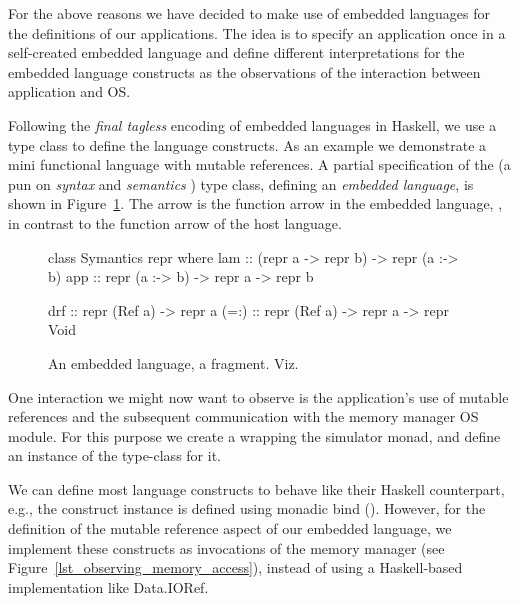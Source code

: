 For the above reasons we have decided to make use of embedded languages for the definitions of our applications.
The idea is to specify an application once in a self-created embedded language and define different interpretations for the embedded language constructs as the observations of the interaction between application and OS\nolinebreak[3]  \cite{Hofer:2008:PED:1449913.1449935}.

Following the \emph{final tagless} \cite{final_tagless_embedding} encoding of embedded languages in Haskell, we use a type class to define the language constructs.
As an example we demonstrate a mini functional language with mutable references.
A partial specification of the  (a pun on \emph{syntax} and \emph{semantics} \cite{final_tagless_embedding}) type class, defining an \emph{embedded language}, is shown in Figure~\ref{fig:embedded_language_interface}.
The arrow \hs{:->} is the function arrow in the embedded language, \eg {}, in contrast to the function arrow \hs{->} of the host language.

\begin{figure}
\begin{code}
class Symantics repr where
  lam   :: (repr a -> repr b) -> repr (a :-> b)
  app   :: repr (a :-> b) -> repr a -> repr b

  drf   :: repr (Ref a) -> repr a
  (=:)  :: repr (Ref a) -> repr a -> repr Void
\end{code}
\vspace{-0.5em}
\caption{An embedded language, a fragment. Viz.~\cite{final_tagless_embedding}}
\vspace{-1em}
\label{fig:embedded_language_interface}
\end{figure}

One interaction we might now want to observe is the application's use of mutable references and the subsequent communication with the memory manager OS module.
For this purpose we create a  wrapping the simulator monad, and define an instance of the  type-class for it.

We can define most language constructs to behave like their Haskell counterpart, e.g., the  construct instance is defined using monadic bind (\hs{>>=}\xspace).
However, for the definition of the mutable reference aspect of our embedded language, we implement these constructs as invocations of the memory manager (see Figure~\ref{lst_observing_memory_access}),
instead of using a Haskell-based implementation like \textsf{Data.IORef}.


